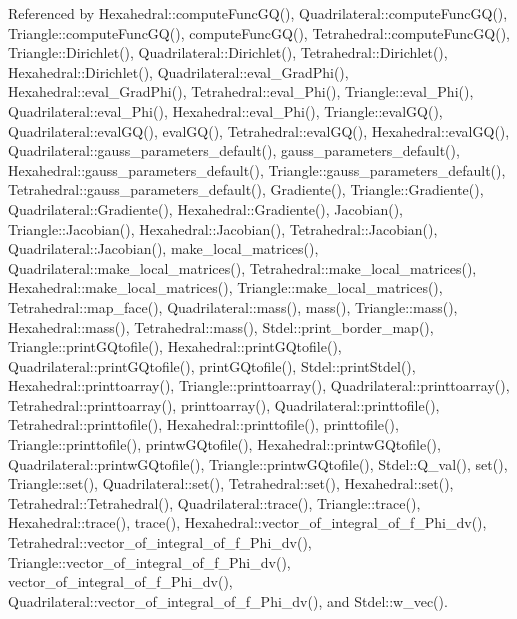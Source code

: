 Referenced by Hexahedral\+::compute\+Func\+G\+Q(), Quadrilateral\+::compute\+Func\+G\+Q(), Triangle\+::compute\+Func\+G\+Q(), compute\+Func\+G\+Q(), Tetrahedral\+::compute\+Func\+G\+Q(), Triangle\+::\+Dirichlet(), Quadrilateral\+::\+Dirichlet(), Tetrahedral\+::\+Dirichlet(), Hexahedral\+::\+Dirichlet(), Quadrilateral\+::eval\+\_\+\+Grad\+Phi(), Hexahedral\+::eval\+\_\+\+Grad\+Phi(), Tetrahedral\+::eval\+\_\+\+Phi(), Triangle\+::eval\+\_\+\+Phi(), Quadrilateral\+::eval\+\_\+\+Phi(), Hexahedral\+::eval\+\_\+\+Phi(), Triangle\+::eval\+G\+Q(), Quadrilateral\+::eval\+G\+Q(), eval\+G\+Q(), Tetrahedral\+::eval\+G\+Q(), Hexahedral\+::eval\+G\+Q(), Quadrilateral\+::gauss\+\_\+parameters\+\_\+default(), gauss\+\_\+parameters\+\_\+default(), Hexahedral\+::gauss\+\_\+parameters\+\_\+default(), Triangle\+::gauss\+\_\+parameters\+\_\+default(), Tetrahedral\+::gauss\+\_\+parameters\+\_\+default(), Gradiente(), Triangle\+::\+Gradiente(), Quadrilateral\+::\+Gradiente(), Hexahedral\+::\+Gradiente(), Jacobian(), Triangle\+::\+Jacobian(), Hexahedral\+::\+Jacobian(), Tetrahedral\+::\+Jacobian(), Quadrilateral\+::\+Jacobian(), make\+\_\+local\+\_\+matrices(), Quadrilateral\+::make\+\_\+local\+\_\+matrices(), Tetrahedral\+::make\+\_\+local\+\_\+matrices(), Hexahedral\+::make\+\_\+local\+\_\+matrices(), Triangle\+::make\+\_\+local\+\_\+matrices(), Tetrahedral\+::map\+\_\+face(), Quadrilateral\+::mass(), mass(), Triangle\+::mass(), Hexahedral\+::mass(), Tetrahedral\+::mass(), Stdel\+::print\+\_\+border\+\_\+map(), Triangle\+::print\+G\+Qtofile(), Hexahedral\+::print\+G\+Qtofile(), Quadrilateral\+::print\+G\+Qtofile(), print\+G\+Qtofile(), Stdel\+::print\+Stdel(), Hexahedral\+::printtoarray(), Triangle\+::printtoarray(), Quadrilateral\+::printtoarray(), Tetrahedral\+::printtoarray(), printtoarray(), Quadrilateral\+::printtofile(), Tetrahedral\+::printtofile(), Hexahedral\+::printtofile(), printtofile(), Triangle\+::printtofile(), printw\+G\+Qtofile(), Hexahedral\+::printw\+G\+Qtofile(), Quadrilateral\+::printw\+G\+Qtofile(), Triangle\+::printw\+G\+Qtofile(), Stdel\+::\+Q\+\_\+val(), set(), Triangle\+::set(), Quadrilateral\+::set(), Tetrahedral\+::set(), Hexahedral\+::set(), Tetrahedral\+::\+Tetrahedral(), Quadrilateral\+::trace(), Triangle\+::trace(), Hexahedral\+::trace(), trace(), Hexahedral\+::vector\+\_\+of\+\_\+integral\+\_\+of\+\_\+f\+\_\+\+Phi\+\_\+dv(), Tetrahedral\+::vector\+\_\+of\+\_\+integral\+\_\+of\+\_\+f\+\_\+\+Phi\+\_\+dv(), Triangle\+::vector\+\_\+of\+\_\+integral\+\_\+of\+\_\+f\+\_\+\+Phi\+\_\+dv(), vector\+\_\+of\+\_\+integral\+\_\+of\+\_\+f\+\_\+\+Phi\+\_\+dv(), Quadrilateral\+::vector\+\_\+of\+\_\+integral\+\_\+of\+\_\+f\+\_\+\+Phi\+\_\+dv(), and Stdel\+::w\+\_\+vec().

